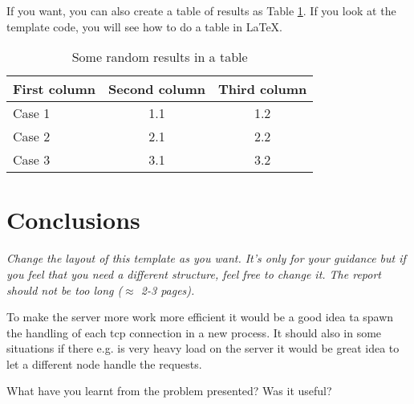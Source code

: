 \documentclass[a4paper, 11pt]{article}
\begin{document}
If you want, you can also create a table of results as Table
\ref{tab:results}. If you look at the template code, you will see how
to do a table in \LaTeX.

\begin{table}[h]
\centering
\begin{tabular}{lcc}
First column & Second column & Third column\\\hline
Case 1 & 1.1 & 1.2\\\hline
Case 2 & 2.1 & 2.2\\\hline
Case 3 & 3.1 & 3.2\\\hline
\end{tabular}
\caption{Some random results in a table}
\label{tab:results}
\end{table}

\section{Conclusions}



\textit{Change the layout of this template as you want. It's only for
  your guidance but if you feel that you need a different structure,
  feel free to change it. The report should not be too long ($\approx$
  2-3 pages).}

To make the server more work more efficient it would be a good idea ta spawn the handling of each tcp connection in a new process.
It should also in some situations if there e.g. is very heavy load on the server it would be great idea to let a different node handle the requests.


What have you learnt from the problem presented?
Was it useful?
\end{document}
